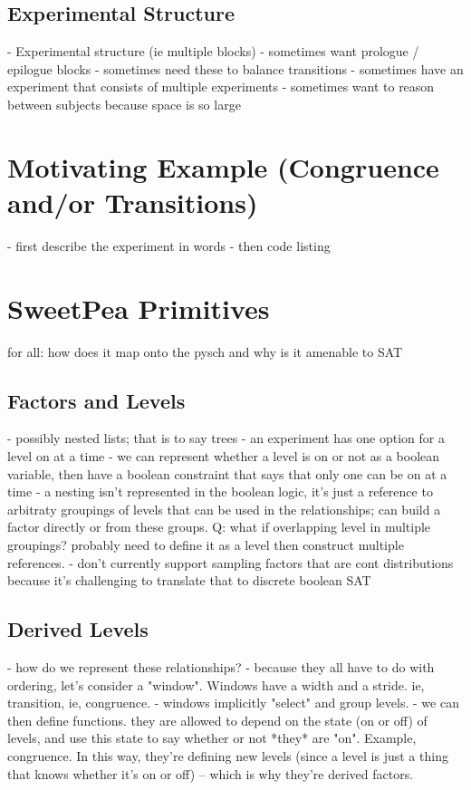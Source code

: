 \subsection{Experimental Structure}
- Experimental structure (ie multiple blocks)
- sometimes want prologue / epilogue blocks
- sometimes need these to balance transitions
- sometimes have an experiment that consists of multiple experiments
- sometimes want to reason between subjects because space is so large

\section{Motivating Example (Congruence and/or Transitions)}

- first describe the experiment in words
- then code listing

\section{SweetPea Primitives}

for all: how does it map onto the pysch and why is it amenable to SAT

\subsection{Factors and Levels}
- possibly nested lists; that is to say trees
- an experiment has one option for a level on at a time
- we can represent whether a level is on or not as a boolean variable, then have a boolean constraint that says that only one can be on at a time
- a nesting isn't represented in the boolean logic, it's just a reference to arbitraty groupings of levels that can be used in the relationships; can build a factor directly or from these groups. Q: what if overlapping level in multiple groupings? probably need to define it as a level then construct multiple references.
- don't currently support sampling factors that are cont distributions because it's challenging to translate that to discrete boolean SAT

\subsection{Derived Levels}
- how do we represent these relationships?
- because they all have to do with ordering, let's consider a "window". Windows have a width and a stride. ie, transition, ie, congruence.
- windows implicitly "select" and group levels. 
- we can then define functions. they are allowed to depend on the state (on or off) of levels, and use this state to say whether or not *they* are "on". Example, congruence. In this way, they're defining new levels (since a level is just a thing that knows whether it's on or off) -- which is why they're derived factors.

